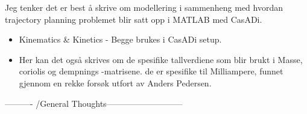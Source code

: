 Jeg tenker det er best å skrive om modellering i sammenheng med hvordan trajectory planning problemet blir satt opp i MATLAB med CasADi.
\begin{itemize}
    \item Kinematics \& Kinetics -\> Begge brukes i CasADi setup.
    \item Her kan det også skrives om de spesifike tallverdiene som blir brukt i Masse, coriolis og dempnings -matrisene.
    de er spesifike til Milliampere, funnet gjennom en rekke forsøk utfort av Anders Pedersen.
\end{itemize}
---------- /General Thoughts--------------------------- 
\fi

